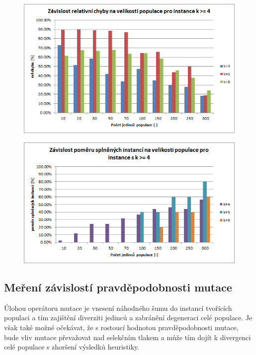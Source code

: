 \documentclass[12pt,oneside,a4paper]{article}
\begin{document}
\begin{figure}[ht]
\centering
\includegraphics[scale=0.75]{obr/pop-size-err-max.png}
\end{figure}

\begin{figure}[ht]
\centering
\includegraphics[scale=0.75]{obr/pop-size-sat-max.png}
\end{figure}

\newpage
\FloatBarrier

\subsection{Meření závislostí pravděpodobnosti mutace}

Úlohou operátoru mutace je vnesení náhodného šumu do instancí tvořících populaci a tím zajištění diverziti jedinců a zabránění degeneraci celé populace. Je však také možné očekávat, že s rostoucí hodnotou pravděpodobnosti mutace, bude vliv mutace převažovat nad selekčním tlakem a může tím dojít k divergenci celé populace s zhoršení výsledků heuristiky.
\end{document}
